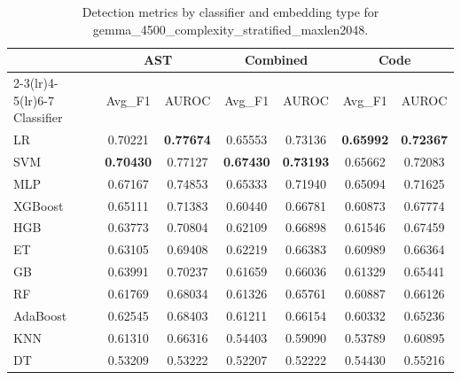 \begin{table}[t]
\centering
\caption{Detection metrics by classifier and embedding type for gemma\_4500\_complexity\_stratified\_maxlen2048.}
\label{tab:rq2d_gemma_4500_complexity_stratified_maxlen2048}
\begin{tabular}{l cc cc cc}
\toprule
 & \multicolumn{2}{c}{AST} & \multicolumn{2}{c}{Combined} & \multicolumn{2}{c}{Code} \\
\cmidrule(lr){2-3}\cmidrule(lr){4-5}\cmidrule(lr){6-7}
Classifier & Avg\_F1 & AUROC & Avg\_F1 & AUROC & Avg\_F1 & AUROC \\
\midrule
LR & 0.70221 & \textbf{0.77674} & 0.65553 & 0.73136 & \textbf{0.65992} & \textbf{0.72367} \\
SVM & \textbf{0.70430} & 0.77127 & \textbf{0.67430} & \textbf{0.73193} & 0.65662 & 0.72083 \\
MLP & 0.67167 & 0.74853 & 0.65333 & 0.71940 & 0.65094 & 0.71625 \\
XGBoost & 0.65111 & 0.71383 & 0.60440 & 0.66781 & 0.60873 & 0.67774 \\
HGB & 0.63773 & 0.70804 & 0.62109 & 0.66898 & 0.61546 & 0.67459 \\
ET & 0.63105 & 0.69408 & 0.62219 & 0.66383 & 0.60989 & 0.66364 \\
GB & 0.63991 & 0.70237 & 0.61659 & 0.66036 & 0.61329 & 0.65441 \\
RF & 0.61769 & 0.68034 & 0.61326 & 0.65761 & 0.60887 & 0.66126 \\
AdaBoost & 0.62545 & 0.68403 & 0.61211 & 0.66154 & 0.60332 & 0.65236 \\
KNN & 0.61310 & 0.66316 & 0.54403 & 0.59090 & 0.53789 & 0.60895 \\
DT & 0.53209 & 0.53222 & 0.52207 & 0.52222 & 0.54430 & 0.55216 \\
\bottomrule
\end{tabular}
\end{table}
